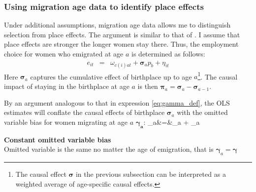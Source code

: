 \subsubsection*{Using migration age data to identify place effects}
Under additional assumptions, migration age data allows me to distinguish selection from place effects. The argument is similar to that of \cite{Chetty2018}.  I assume that place effects are stronger the longer women stay there. Thus, the employment choice for women who emigrated at age $a$ is determined as follows:
\begin{eqnarray}
	\label{eq:childhood_true_age}
	e_{it}&=&\omega_{c(i)at}+\boldsymbol\sigma_a p_{b}+\eta_{it}
\end{eqnarray}
Here $\boldsymbol\sigma_a$ captures the cumulative effect of birthplace up to age $a$\footnote{The causal effect $\boldsymbol{\sigma}$ in the previous subsection can be interpreted as a weighted average of age-specific causal effects.}. The causal impact of staying in the birthplace at age $a$ is then $\boldsymbol\pi_a=\boldsymbol\sigma_{a}-\boldsymbol\sigma_{a-1}$.

By an argument analogous to that in expression \eqref{eq:gamma_def}, the OLS estimates will conflate the causal effects of birthplace $\boldsymbol\sigma_a$ with the omitted variable bias for women migrating at age $a$ $\boldsymbol{\gamma_a}$:%
\beqn
\plim \boldsymbol{\hat\sigma}_a&=&\boldsymbol\sigma_a + \boldsymbol\gamma_a
\eeqn


\begin{assumption}{\textbf{Constant omitted variable bias}} \\
	Omitted variable is the same no matter the age of emigration, that is $\boldsymbol{\gamma}_{a}=\boldsymbol{\gamma}$
\end{assumption}

